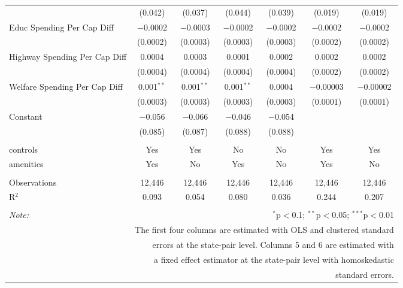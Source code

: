 \begin{table}[!htbp]
\begin{tabular}{@{\extracolsep{5pt}}lcccccc}
  & (0.042) & (0.037) & (0.044) & (0.039) & (0.019) & (0.019) \\ 
  Educ Spending Per Cap Diff & $-$0.0002 & $-$0.0003 & $-$0.0002 & $-$0.0002 & $-$0.0002 & $-$0.0002 \\ 
  & (0.0002) & (0.0003) & (0.0003) & (0.0003) & (0.0002) & (0.0002) \\ 
  Highway Spending Per Cap Diff & 0.0004 & 0.0003 & 0.0001 & 0.0002 & 0.0002 & 0.0002 \\ 
  & (0.0004) & (0.0004) & (0.0004) & (0.0004) & (0.0002) & (0.0002) \\ 
  Welfare Spending Per Cap Diff & 0.001$^{**}$ & 0.001$^{**}$ & 0.001$^{**}$ & 0.0004 & $-$0.00003 & $-$0.00002 \\ 
  & (0.0003) & (0.0003) & (0.0003) & (0.0003) & (0.0001) & (0.0001) \\ 
  Constant & $-$0.056 & $-$0.066 & $-$0.046 & $-$0.054 &  &  \\ 
  & (0.085) & (0.087) & (0.088) & (0.088) &  &  \\ 
 \hline \\[-1.8ex] 
controls & Yes & Yes & No & No & Yes & Yes \\ 
amenities & Yes & No & Yes & No & Yes & No \\ 
\hline \\[-1.8ex] 
Observations & 12,446 & 12,446 & 12,446 & 12,446 & 12,446 & 12,446 \\ 
R$^{2}$ & 0.093 & 0.054 & 0.080 & 0.036 & 0.244 & 0.207 \\ 
\hline 
\hline \\[-1.8ex] 
\textit{Note:}  & \multicolumn{6}{r}{$^{*}$p$<$0.1; $^{**}$p$<$0.05; $^{***}$p$<$0.01} \\ 
 & \multicolumn{6}{r}{The first four columns are estimated with OLS and clustered standard} \\ 
 & \multicolumn{6}{r}{ errors at the state-pair level. Columns 5 and 6 are estimated with} \\ 
 & \multicolumn{6}{r}{a fixed effect estimator at the state-pair level with homoskedastic} \\ 
 & \multicolumn{6}{r}{standard errors.} \\ 
\end{tabular} 
\end{table} 
